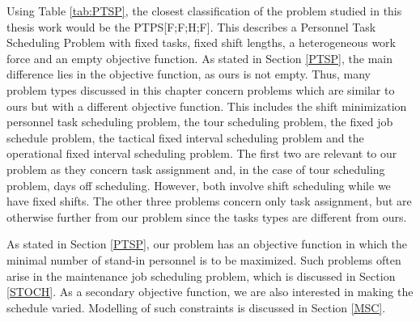 Using Table \ref{tab:PTSP}, the closest classification of the problem studied in this thesis work would be the PTPS[F;F;H;F]. This describes a Personnel Task Scheduling Problem with fixed tasks, fixed shift lengths, a heterogeneous work force and an empty objective function. As stated in Section \ref{PTSP}, the main difference lies in the objective function, as ours is not empty. Thus, many problem types discussed in this chapter concern problems which are similar to ours but with a different objective function. This includes the shift minimization personnel task scheduling problem, the tour scheduling problem, the fixed job schedule problem, the tactical fixed interval scheduling problem and the operational fixed interval scheduling problem. The first two are relevant to our problem as they concern task assignment and, in the case of tour scheduling problem, days off scheduling. However, both involve shift scheduling while we have fixed shifts. The other three problems concern only task assignment, but are otherwise further from our problem since the tasks types are different from ours.

As stated in Section \ref{PTSP}, our problem has an objective function in which the minimal number of stand-in personnel is to be maximized. Such problems often arise in the maintenance job scheduling problem, which is discussed in Section \ref{STOCH}. As a secondary objective function, we are also interested in making the schedule varied. Modelling of such constraints is discussed in Section \ref{MSC}.







